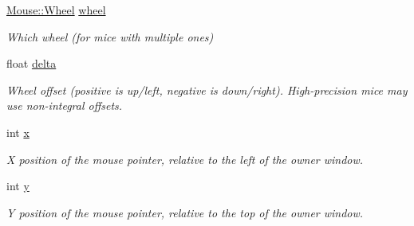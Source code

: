 \begin{DoxyCompactItemize}
\item 
\mbox{\label{structsf_1_1_event_1_1_mouse_wheel_scroll_event_a1d82dccecc46968d517b2fc66639dd74}} 
\mbox{\hyperlink{classsf_1_1_mouse_a60dd479a43f26f200e7957aa11803ff4}{Mouse\+::\+Wheel}} \mbox{\hyperlink{structsf_1_1_event_1_1_mouse_wheel_scroll_event_a1d82dccecc46968d517b2fc66639dd74}{wheel}}
\begin{DoxyCompactList}\small\item\em Which wheel (for mice with multiple ones) \end{DoxyCompactList}\item 
\mbox{\label{structsf_1_1_event_1_1_mouse_wheel_scroll_event_ac45c164997a594d424071e74b53b5817}} 
float \mbox{\hyperlink{structsf_1_1_event_1_1_mouse_wheel_scroll_event_ac45c164997a594d424071e74b53b5817}{delta}}
\begin{DoxyCompactList}\small\item\em Wheel offset (positive is up/left, negative is down/right). High-\/precision mice may use non-\/integral offsets. \end{DoxyCompactList}\item 
\mbox{\label{structsf_1_1_event_1_1_mouse_wheel_scroll_event_a3d17cae0568d18083f879655abdc8ae4}} 
int \mbox{\hyperlink{structsf_1_1_event_1_1_mouse_wheel_scroll_event_a3d17cae0568d18083f879655abdc8ae4}{x}}
\begin{DoxyCompactList}\small\item\em X position of the mouse pointer, relative to the left of the owner window. \end{DoxyCompactList}\item 
\mbox{\label{structsf_1_1_event_1_1_mouse_wheel_scroll_event_aa38bf23704162024eed19917eef3853c}} 
int \mbox{\hyperlink{structsf_1_1_event_1_1_mouse_wheel_scroll_event_aa38bf23704162024eed19917eef3853c}{y}}
\begin{DoxyCompactList}\small\item\em Y position of the mouse pointer, relative to the top of the owner window. \end{DoxyCompactList}\end{DoxyCompactItemize}



